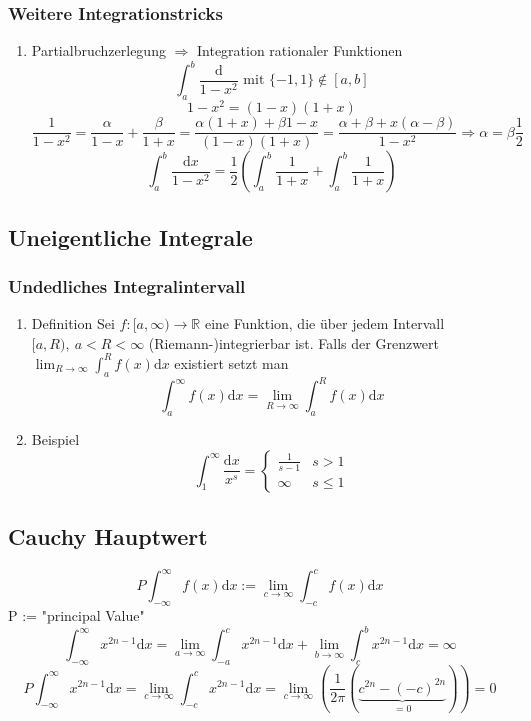 \documentclass[11pt]{article}
\begin{document}
\subsubsection{Weitere Integrationstricks}
\label{sec-11-3-4}
\begin{enumerate}
\item Partialbruchzerlegung
\label{sec-11-3-4-1}
$\Rightarrow$ Integration rationaler Funktionen
\[\int_a^b\frac{\mathrm{d}}{1-x^2} \text{ mit } \{-1,1\}\not\in [a,b] \]
\[1-x^2 = (1-x)(1+x)\]
\[\frac{1}{1-x^2} = \frac{\alpha}{1-x} + \frac{\beta}{1+x} = \frac{\alpha(1+x)+\beta{1-x}}{(1-x)(1+x)} = \frac{\alpha + \beta + x(\alpha - \beta)}{1-x^2} \Rightarrow \alpha = \beta \frac{1}{2}\]
\[\int_a^b \frac{\mathrm{d}x}{1-x^2} = \frac{1}{2}(\int_a^b\frac{1}{1+x} + \int_a^b\frac{1}{1+x})\]
\end{enumerate}
\subsection{Uneigentliche Integrale}
\label{sec-11-4}
\subsubsection{Undedliches Integralintervall}
\label{sec-11-4-1}
\begin{enumerate}
\item Definition
\label{sec-11-4-1-1}
Sei $f:[a,\infty)\rightarrow\mathbb{R}$ eine Funktion, die über jedem Intervall $[a,R),~a<R<\infty$ (Riemann-)integrierbar ist. Falls der Grenzwert $\lim_{R\to\infty}\int_a^R f(x)\mathrm{d}x$ existiert setzt man \[\int_a^\infty f(x)\mathrm{d}x=\lim_{R\to\infty}\int_a^R f(x)\mathrm{d}x\]
\item Beispiel
\label{sec-11-4-1-2}
\[\int_1^\infty\frac{\mathrm{d}x}{x^s}=\begin{cases}\frac{1}{s-1}&s>1\\ \infty & s\leq 1\end{cases}\]
\end{enumerate}
\subsection{Cauchy Hauptwert}
\label{sec-11-5}
\[P\int_{-\infty}^\infty f(x)\mathrm{d}x := \lim_{c\to\infty}\int_{-c}^c f(x)\mathrm{d}x\]
P := "principal Value"
\[\int_{-\infty}^\infty x^{2n-1}\mathrm{d}x = \lim_{a\to\infty}\int_{-a}^c x^{2n-1}\mathrm{d}x + \lim_{b\to\infty}\int_c^b x^{2n-1}\mathrm{d}x = \infty\]
\[P\int_{-\infty}^\infty x^{2n-1}\mathrm{d}x = \lim_{c\to\infty}\int_{-c}^c x^{2n-1}\mathrm{d}x = \lim_{c\to\infty}(\frac{1}{2\pi}(\underbrace{c^{2n}-(-c)^{2n}}_{=0})) = 0\]
\end{document}
